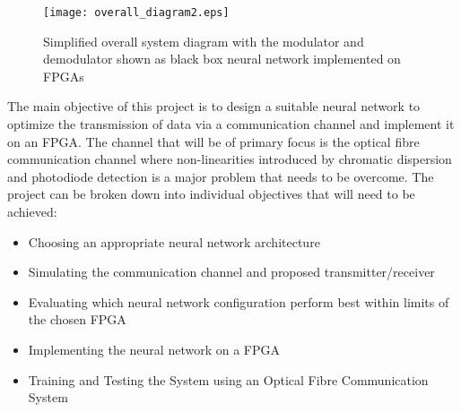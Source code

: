 
\iffalse
Your objectives are the most important part of the proposal. 

Tell the reader what you intend to accomplish; 
	see if you can state the expected outcomes in a clear fashion so that you know, 
	and the reader knows, what you are going to have when finished.
	
What theory will you work out? 
Or what measurements will you make? 
Or what circuit will you build? 
The clearer you are with this, the higher the chances will be for knowing how to get there.
Break the Objectives down into pieces on which each of your teammates will focus. 
Show how the individual objectives create the project’s overall end objective.

Once you know what you will be doing, put the steps into a Gantt Chart.Look online for a Gantt Chart description if you need to.


\fi

\begin{figure}[H]
	\centering
	\texttt{[image: overall\_diagram2.eps]}
	\caption{Simplified overall system diagram with the modulator and demodulator shown as black box neural network implemented on FPGAs}
	\label{fig:overall}	
\end{figure}

The main objective of this project is to design a suitable neural network to optimize the transmission of data via a communication channel and implement it on an FPGA. The channel that will be of primary focus is the optical fibre communication channel where non-linearities introduced by chromatic dispersion and photodiode detection is a major problem that needs to be overcome. The project can be broken down into individual objectives that will need to be achieved:

\begin{itemize}
    \item Choosing an appropriate neural network architecture
    \item Simulating the communication channel and proposed transmitter/receiver
    \item Evaluating which neural network configuration perform best within limits of the chosen FPGA
    \item Implementing the neural network on a FPGA
    \item Training and Testing the System using an Optical Fibre Communication System
\end{itemize}


